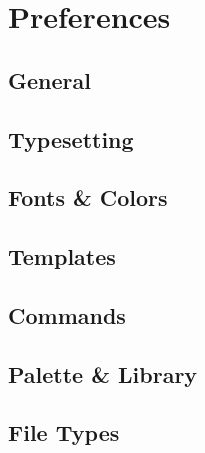 \section{Preferences}
\label{sec:preferences}

\subsection{General}
\label{sec:preferences:general}

\subsection{Typesetting}
\label{sec:preferences:typesetting}

\subsection{Fonts \& Colors}
\label{sec:preferences:fontsandcolors}

\subsection{Templates}
\label{sec:preferences:templates}

\subsection{Commands}
\label{sec:preferences:commands}

\subsection{Palette \& Library}
\label{sec:preferences:paletteandlibrary}

\subsection{File Types}
\label{sec:preferences:filetypes}



